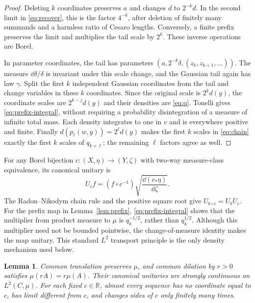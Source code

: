 \documentclass[11pt]{article}
\newtheorem{lemma}[theorem]{Lemma}
\theoremstyle{remark}\newtheorem{remark}[theorem]{Remark}
\newcommand{\R}{\mathbb R}\newcommand{\N}{\mathbb N}
\begin{document}
\begin{proof}
Deleting $k$ coordinates preserves $a$ and changes $d$ to $2^{-k}d$.
In the second limit in \eqref{eq:recover}, this is the factor $4^{-k}$,
after deletion of finitely many summands and a harmless ratio of Cesaro
lengths. Conversely, a finite prefix preserves the limit and multiplies the
tail scale by $2^k$. These inverse operations are Borel.

In parameter coordinates, the tail has parameters
$(a,2^{-k}\delta,(z_k,z_{k+1},\ldots))$. The measure $\dd\delta/\delta$
is invariant under this scale change, and the Gaussian tail again has law
$\gamma$. Split the first $k$ independent Gaussian coordinates from the tail
and change variables in these $k$ coordinates. Since the original scale is
$2^kd(y)$, the coordinate scales are $2^{k-j}d(y)$ and their densities are
\eqref{eq:q}. Tonelli gives \eqref{eq:prefix-integral}, without requiring
a probability disintegration of a measure of infinite total mass. Each
density integrates to one in $v$ and is everywhere positive and finite.
Finally $d(p_\ell(w,y))=2^\ell d(y)$ makes the first $k$ scales in
\eqref{eq:chain} exactly the first $k$ scales of $q_{k+\ell}$; the remaining
$\ell$ factors agree as well.
\end{proof}

For any Borel bijection $c:(X,\eta)\to(Y,\zeta)$ with two-way measure-class
equivalence, its canonical unitary is
\begin{equation}\label{eq:canonical}
 U_cf=(f\circ c^{-1})\sqrt{\frac{\dd(c_*\eta)}{\dd\zeta}}.
\end{equation}
The Radon--Nikodym chain rule and the positive square root give
$U_{b\circ c}=U_bU_c$. For the prefix map in Lemma~\ref{lem:prefix},
\eqref{eq:prefix-integral} shows that the multiplier from product measure to
$\mu$ is $q_k^{-1/2}$, rather than $q_k^{1/2}$. Although this multiplier
need not be bounded pointwise, the change-of-measure identity makes the map
unitary. This standard $L^2$ transport principle is the only density mechanism
used below.

\begin{lemma}\label{lem:actions}
Common translation preserves $\mu$, and common dilation by $r>0$ satisfies
$\mu(rA)=r\mu(A)$. Their canonical unitaries are strongly continuous on
$L^2(C,\mu)$. For each fixed $c\in\R$, almost every sequence has no
coordinate equal to $c$, has limit different from $c$, and changes sides of
$c$ only finitely many times.
\end{lemma}
\end{document}
